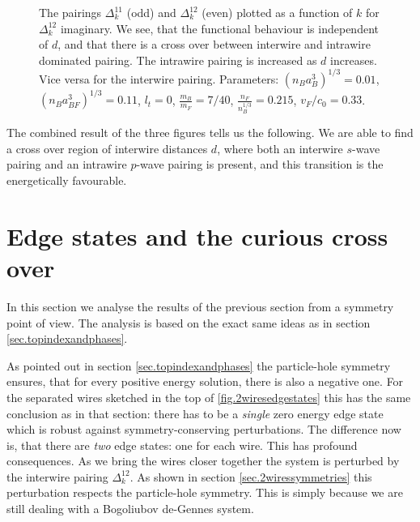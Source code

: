 \begin{figure} 
\begin{center}  
  
\caption{The pairings $\Delta^{11}_k$ (odd) and $\Delta^{12}_k$ (even) plotted as a function of $k$ for $\Delta^{12}_k$ imaginary. We see, that the functional behaviour is independent of $d$, and that there is a cross over between interwire and intrawire dominated pairing. The intrawire pairing is increased as $d$ increases. Vice versa for the interwire pairing. Parameters: $(n_Ba_B^3)^{1/3} = 0.01$, $(n_Ba_{BF}^3)^{1/3} = 0.11$, $l_t = 0$, $\frac{m_B}{m_F} = 7/40$, $\frac{n_F}{n_B^{1/3}} = 0.215$, $v_F/c_0 = 0.33$. }  
\label{fig.pairingkdependT0dvaried}  
\end{center}    
\end{figure}

The combined result of the three figures tells us the following. We are able to find a cross over region of interwire distances $d$, where both an interwire $s$-wave pairing and an intrawire $p$-wave pairing is present, and this transition is the energetically favourable. 

\section{Edge states and the curious cross over}
\label{sec.2wiresedgestates_crossover_topology}
In this section we analyse the results of the previous section from a symmetry point of view. The analysis is based on the exact same ideas as in section \ref{sec.topindexandphases}. 

As pointed out in section \ref{sec.topindexandphases} the particle-hole symmetry ensures, that for every positive energy solution, there is also a negative one. For the separated wires sketched in the top of \ref{fig.2wiresedgestates} this has the same conclusion as in that section: there has to be a \textit{single} zero energy edge state which is robust against symmetry-conserving perturbations. The difference now is, that there are \textit{two} edge states: one for each wire. This has profound consequences. As we bring the wires closer together the system is perturbed by the interwire pairing $\Delta^{12}_k$. As shown in section \ref{sec.2wiressymmetries} this perturbation respects the particle-hole symmetry. This is simply because we are still dealing with a Bogoliubov de-Gennes system. 

